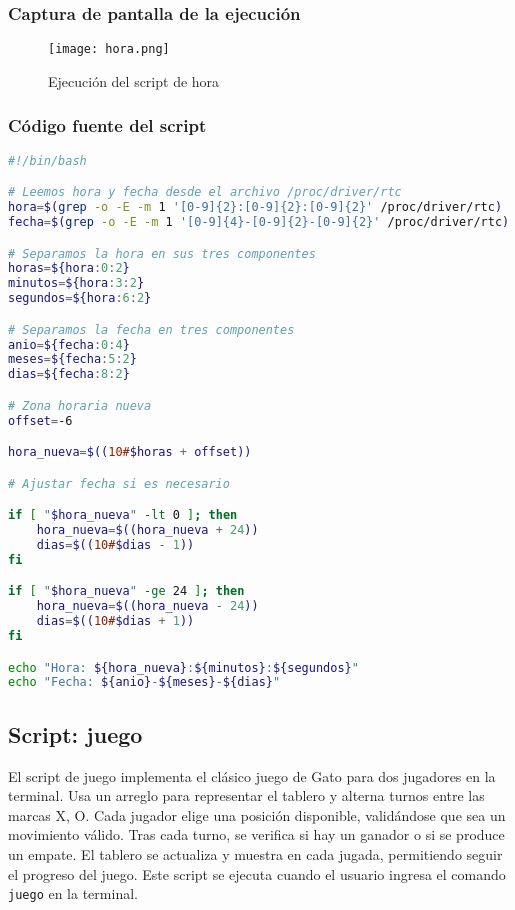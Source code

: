 \documentclass{article}
\begin{document}
\subsubsection{Captura de pantalla de la ejecución}

\begin{figure}[h!]
\centering
\texttt{[image: hora.png]}
\caption{Ejecución del script de hora}
\end{figure}

\subsubsection{Código fuente del script}

\begin{lstlisting}[language=bash]
#!/bin/bash

# Leemos hora y fecha desde el archivo /proc/driver/rtc
hora=$(grep -o -E -m 1 '[0-9]{2}:[0-9]{2}:[0-9]{2}' /proc/driver/rtc)
fecha=$(grep -o -E -m 1 '[0-9]{4}-[0-9]{2}-[0-9]{2}' /proc/driver/rtc)

# Separamos la hora en sus tres componentes
horas=${hora:0:2}
minutos=${hora:3:2}
segundos=${hora:6:2}

# Separamos la fecha en tres componentes
anio=${fecha:0:4}
meses=${fecha:5:2}
dias=${fecha:8:2}

# Zona horaria nueva
offset=-6

hora_nueva=$((10#$horas + offset))

# Ajustar fecha si es necesario

if [ "$hora_nueva" -lt 0 ]; then
    hora_nueva=$((hora_nueva + 24))
    dias=$((10#$dias - 1))
fi

if [ "$hora_nueva" -ge 24 ]; then
    hora_nueva=$((hora_nueva - 24))
    dias=$((10#$dias + 1))
fi

echo "Hora: ${hora_nueva}:${minutos}:${segundos}"
echo "Fecha: ${anio}-${meses}-${dias}"

\end{lstlisting}
\pagebreak
\subsection{Script: juego}

El script de juego implementa el clásico juego de Gato para dos jugadores en la terminal. Usa un arreglo para representar el tablero y alterna turnos entre las marcas X, O. Cada jugador elige una posición disponible, validándose que sea un movimiento válido. Tras cada turno, se verifica si hay un ganador o si se produce un empate. El tablero se actualiza y muestra en cada jugada, permitiendo seguir el progreso del juego. 
Este script se ejecuta cuando el usuario ingresa el comando \texttt{juego} en la terminal.
\end{document}
